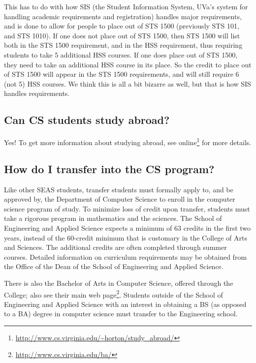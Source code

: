 \documentclass[10pt,letter]{book}
\newcommand{\myurl}[1]{\footnote{\scriptsize\url{#1}}}
\begin{document}
This has to do with how SIS (the Student Information System, UVa's
system for handling academic requirements and registration) handles
major requirements, and is done to allow for people to place out of
STS 1500 (previously STS 101, and STS 1010). If one does not
place out of STS 1500, then STS 1500 will list both in the STS 1500
requirement, and in the HSS requirement, thus requiring students to
take 5 additional HSS courses. If one does place out of STS 1500, they
need to take an additional HSS course in its place. So the credit to
place out of STS 1500 will appear in the STS 1500 requirements, and
will still require 6 (not 5) HSS courses. We think this is all a bit
bizarre as well, but that is how SIS handles requirements.


\subsection{Can CS students study abroad?}

Yes! To get more information about studying abroad, see
online\myurl{http://www.cs.virginia.edu/~horton/study_abroad/}
for more details.
 
\subsection{How do I transfer into the CS program?}

Like other SEAS students, transfer students must formally apply to,
and be approved by, the Department of Computer Science to enroll in
the computer science program of study. To minimize loss of credit upon
transfer, students must take a rigorous program in mathematics and the
sciences. The School of Engineering and Applied Science expects a
minimum of 63 credits in the first two years, instead of the 60-credit
minimum that is customary in the College of Arts and Sciences. The
additional credits are often completed through summer
courses. Detailed information on curriculum requirements may be
obtained from the Office of the Dean of the School of Engineering and
Applied Science.

There is also the Bachelor of Arts in Computer Science, offered
through the College; also see their main
web page\myurl{http://www.cs.virginia.edu/ba/}. Students
outside of the School of Engineering and Applied Science with an
interest in obtaining a BS (as opposed to a BA) degree in computer
science must transfer to the Engineering school.
\end{document}

